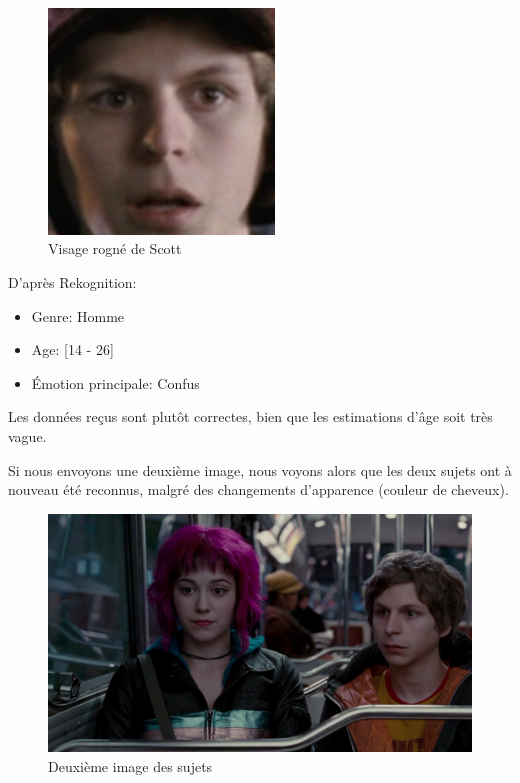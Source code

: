 \begin{figure}[H]
	\centering
	\includegraphics[width=6cm]{images/facial_reco/scott_hidden.png}
    \caption{Visage rogné de Scott}
	\label{fig:hidden_face_scott}
\end{figure}

D'après Rekognition:
\begin{itemize}
    \item Genre: Homme
    \item Age: [14 - 26]
    \item Émotion principale: Confus 
\end{itemize}

Les données reçus sont plutôt correctes, bien que les estimations d'âge soit très vague.

Si nous envoyons une deuxième image, nous voyons alors que les deux sujets ont à nouveau été reconnus, malgré des changements d'apparence (couleur de cheveux).

\begin{figure}[H]
	\centering
	\includegraphics[width=12cm]{images/facial_reco/scott2.png}
    \caption{Deuxième image des sujets}
	\label{fig:scott2}
\end{figure}


